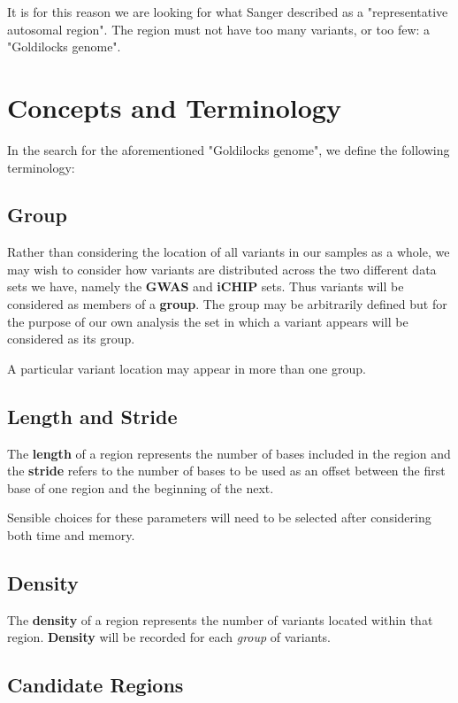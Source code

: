 It is for this reason we are looking for what Sanger described as a
"representative autosomal region". The region must not have too many
variants, or too few: a "Goldilocks genome".


\section{Concepts and Terminology}

In the search for the aforementioned "Goldilocks genome", we define the
following terminology:

\subsection{Group}

Rather than considering the location of all variants in our samples as a whole,
we may wish to consider how variants are distributed across the two different
data sets we have, namely the \textbf{GWAS} and \textbf{iCHIP} sets. Thus variants
will be considered as members of a \textbf{group}. The group may be
arbitrarily defined but for the purpose of our own analysis the set in which a
variant appears will be considered as its group.

A particular variant location may appear in more than one group.


\subsection{Length and Stride}
\label{sec:lengthstride}

The \textbf{length} of a region represents the number of bases included in the
region and the \textbf{stride} refers to the number of bases to be used as an
offset between the first base of one region and the beginning of the next.

Sensible choices for these parameters will need to be selected after considering
both time and memory.


\subsection{Density}

The \textbf{density} of a region represents the number of variants located
within that region. \textbf{Density} will be recorded for each \textit{group} of
variants.


\subsection{Candidate Regions}

